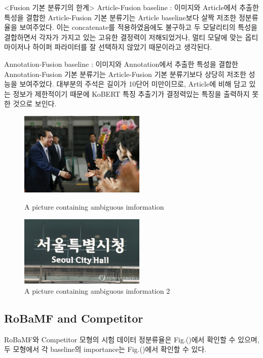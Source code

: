 \documentclass{article}
\begin{document}
<Fusion 기본 분류기의 한계>
Article-Fusion baseline : 이미지와 Article에서 추출한  특성을 결합한 Article-Fusion 기본 분류기는 Article baseline보다 살짝 저조한 정분류율을 보여주었다.
이는 concatenate를 적용하였음에도 불구하고 두 모달리티의 특성을 결합하면서 각자가 가지고 있는 고유한 결정력이 저해되었거나, 멀티 모달에 맞는 옵티마이저나 하이퍼 파라미터를 잘 선택하지 않았기 때문이라고 생각된다.

Annotation-Fusion baseline : 이미지와 Annotation에서 추출한 특성을 결합한 Annotation-Fusion 기본 분류기는 Article-Fusion 기본 분류기보다 상당히 저조한 성능을 보여주었다.
대부분의 주석은 길이가 10단어 미만이므로, Article에 비해 담고 있는 정보가 제한적이기 때문에 KoBERT 특징 추출기가 결정력있는 특징을 출력하지 못한 것으로 보인다.

\begin{figure}[ht]
    \centering
    \begin{minipage}{0.48\textwidth}
        \centering
        \includegraphics[width=6cm]{ENG/fig.4-1.png} %
        \caption{A picture containing ambiguous imformation}
        \label{fig.7}
        
    \end{minipage}\hfill
    \begin{minipage}{0.48\textwidth}
        \centering
        \includegraphics[width=6cm]{ENG/fig.4-2.jpg} %
        \caption{A picture containing ambiguous imformation 2}
        \label{fig.8}
    \end{minipage}
\end{figure}


\subsection{RoBaMF and Competitor}
RoBaMF와 Competitor 모형의 시험 데이터 정분류율은 Fig.()에서 확인할 수 있으며,
두 모형에서 각 baseline의 importance는 Fig.()에서 확인할 수 있다.
\end{document}

